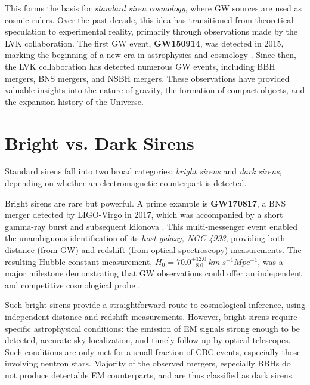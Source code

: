 This forms the basis for \textit{standard siren cosmology}, where \ac{GW} sources are used as cosmic rulers. Over the past decade, this idea has transitioned from theoretical speculation to experimental reality, primarily through observations made by the \acf{LVK} collaboration. The first \ac{GW} event, \textbf{GW150914}, was detected in 2015, marking the beginning of a new era in astrophysics and cosmology \citep{abbott2016gw150914}. Since then, the \ac{LVK} collaboration has detected numerous \ac{GW} events, including \acf{BBH} mergers, \acf{BNS} mergers, and \acf{NSBH} mergers. These observations have provided valuable insights into the nature of gravity, the formation of compact objects, and the expansion history of the Universe.

\newpage
\section{Bright vs. Dark Sirens}
Standard sirens fall into two broad categories: \textit{bright sirens} and \textit{dark sirens}, depending on whether an electromagnetic counterpart is detected.

Bright sirens are rare but powerful. A prime example is \textbf{GW170817}, a \ac{BNS} merger detected by LIGO-Virgo in 2017, which was accompanied by a short gamma-ray burst and subsequent kilonova \citep{LIGOScientific:2017adf}. This multi-messenger event enabled the unambiguous identification of its \textit{host galaxy, NGC 4993}, providing both distance (from \ac{GW}) and redshift (from optical spectroscopy) measurements. The resulting Hubble constant measurement, $H_0 = 70.0^{+12.0}_{-8.0}~km~s^{-1}Mpc^{-1}$, was a major milestone demonstrating that \ac{GW} observations could offer an independent and competitive cosmological probe \citep{LIGOScientific:2017adf}.

Such bright sirens provide a straightforward route to cosmological inference, using independent distance and redshift measurements. However, bright sirens require specific astrophysical conditions: the emission of \ac{EM} signals strong enough to be detected, accurate sky localization, and timely follow-up by optical telescopes. Such conditions are only met for a small fraction of \ac{CBC} events, especially those involving neutron stars. Majority of the observed mergers, especially \acfp{BBH} do not produce detectable \ac{EM} counterparts, and are thus classified as dark sirens.

